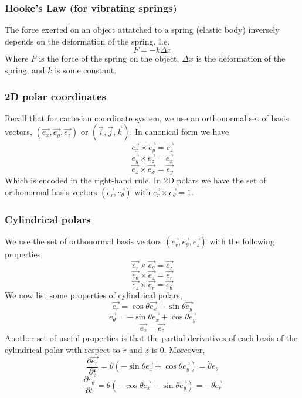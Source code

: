 \subsubsection{Hooke's Law (for vibrating springs)}
\begin{definition}
  The force exerted on an object attatched to a spring (elastic body) inversely
  depends on the deformation of the spring. I.e.
  \[F = -k\Delta x \]
  Where $F$ is the force of the spring on the object, $\Delta x$ is the
  deformation of the spring, and $k$ is some constant.
  \label{def:hookeLaw}
\end{definition}

\subsubsection{2D polar coordinates}
Recall that for cartesian coordinate system, we use an orthonormal set of basis
vectors, $(\vec{e_x}, \vec{e_y}, \vec{e_z})$ or $(\vec{i}, \vec{j}, \vec{k})$.
In canonical form we have
\[\vec{e_x} \times \vec{e_y} = \vec{e_z}\]
\[\vec{e_y} \times \vec{e_z} = \vec{e_x}\]
\[\vec{e_z} \times \vec{e_x} = \vec{e_y}\]
Which is encoded in the right-hand rule. In 2D polars we have the set of
orthonormal basis vectors $(\vec{e_r}, \vec{e_{\theta}})$ with $\vec{e_r}\times
\vec{e_{\theta}} = 1$.

\subsubsection{Cylindrical polars}
We use the set of orthonormal basis vectors $(\vec{e_r},\vec{e_{\theta}},
\vec{e_z})$ with the following properties,
\[\vec{e_r} \times \vec{e_{\theta}} = \vec{e_z}\]
\[\vec{e_{\theta}} \times \vec{e_z} = \vec{e_r}\]
\[\vec{e_z} \times \vec{e_{r}} = \vec{e_{\theta}}\]
We now list some properties of cylindrical polars,
\[\vec{e_r} = \cos\theta \vec{e_x} + \sin\theta \vec{e_y}\]
\[\vec{e_{\theta}} = -\sin\theta \vec{e_x} + \cos\theta \vec{e_y}\]
\[\vec{e_z} = \vec{e_z}\]
Another set of useful properties is that the partial derivatives of each basis
of the cylindrical polar with respect to $r$ and $z$ is $0$. Moreover, 
\[\frac{\partial \vec{e_r}}{\partial t} = \dot{\theta}(-\sin\theta \vec{e_{x}} +
\cos\theta\vec{e_y}) = \dot{\theta} e_{\theta}\]
\[\frac{\partial\vec{e_{\theta}}}{\partial t} =
\dot{\theta}(-\cos{\theta}\vec{e_x}-\sin\theta\vec{e_y}) = -\dot{\theta}\vec{e_r}\]

